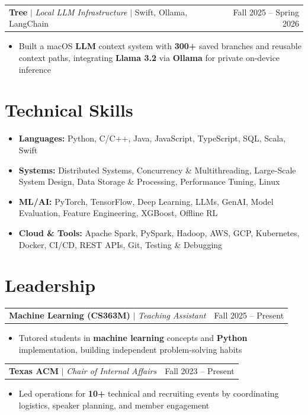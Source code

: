 \documentclass[letterpaper,10pt]{article}
\makeatletter
\newcommand{\resumeWorkHeading}[2]{%
  \vspace{2pt}\noindent
  \begin{tabular*}{\textwidth}{@{}l@{\extracolsep{\fill}}r@{}}
    #1 & #2 \\
  \end{tabular*}%
  \vspace{-2pt}
}
\newcommand{\resumeItemListStart}{\begin{itemize}}
\newcommand{\resumeItemListEnd}{\end{itemize}\vspace{3pt}}
\newcommand{\resumeItem}[1]{\item #1}
\makeatother
\begin{document}
\resumeWorkHeading
{\textbf{Tree} $|$ \emph{Local LLM Infrastructure} $|$ Swift, Ollama, LangChain}{Fall 2025 -- Spring 2026}
\resumeItemListStart
\resumeItem{Built a macOS \textbf{LLM} context system with \textbf{300+} saved branches and reusable context paths, integrating \textbf{Llama 3.2} via \textbf{Ollama} for private on-device inference}
\resumeItemListEnd

\section{Technical Skills}
\begin{itemize}[leftmargin=0em,label={},itemsep=1pt,parsep=0pt,topsep=2pt]
\item \textbf{Languages:} Python, C/C++, Java, JavaScript, TypeScript, SQL, Scala, Swift
\item \textbf{Systems:} Distributed Systems, Concurrency \& Multithreading, Large-Scale System Design, Data Storage \& Processing, Performance Tuning, Linux
\item \textbf{ML/AI:} PyTorch, TensorFlow, Deep Learning, LLMs, GenAI, Model Evaluation, Feature Engineering, XGBoost, Offline RL
\item \textbf{Cloud \& Tools:} Apache Spark, PySpark, Hadoop, AWS, GCP, Kubernetes, Docker, CI/CD, REST APIs, Git, Testing \& Debugging
\end{itemize}

\section{Leadership}
\resumeWorkHeading
{\textbf{Machine Learning (CS363M)} $|$ \emph{Teaching Assistant}}{Fall 2025 -- Present}
\resumeItemListStart
\resumeItem{Tutored students in \textbf{machine learning} concepts and \textbf{Python} implementation, building independent problem-solving habits}
\resumeItemListEnd

\resumeWorkHeading
{\textbf{Texas ACM} $|$ \emph{Chair of Internal Affairs}}{Fall 2023 -- Present}
\resumeItemListStart
\resumeItem{Led operations for \textbf{10+} technical and recruiting events by coordinating logistics, speaker planning, and member engagement}
\resumeItemListEnd
\end{document}
